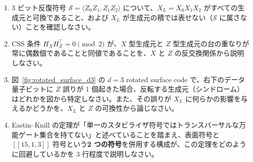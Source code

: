 \begin{exercise}
  \begin{enumerate}
    \item 3 ビット反復符号 $\mathcal{S}=\langle Z_0Z_1, Z_1Z_2\rangle$ について、$X_L=X_0X_1X_2$ がすべての生成元と可換であること、および $X_L$ が生成元の積では表せない（$\mathcal{S}$ に属さない）ことを確認しなさい。
    \item CSS 条件 $H_XH_Z^{\top}=0\pmod2$ が、$X$ 型生成元と $Z$ 型生成元の台の重なりが常に偶数個であることと同値であることを、$X$ と $Z$ の反交換関係から説明しなさい。
    \item 図~\ref{fig:rotated_surface_d3} の $d=3$ rotated surface code で、右下のデータ量子ビットに $Z$ 誤りが 1 個起きた場合、反転する生成元（シンドローム）はどれかを図から特定しなさい。また、その誤りが $X_L$ に何らかの影響を与えるかどうかを、$X_L$ と $Z$ の可換性から論じなさい。
    \item Eastin--Knill の定理が「単一のスタビライザ符号ではトランスバーサルな万能ゲート集合を持てない」と述べていることを踏まえ、表面符号と $[[15,1,3]]$ 符号という\textbf{2 つの符号}を併用する構成が、この定理をどのように回避しているかを 3 行程度で説明しなさい。
  \end{enumerate}
\end{exercise}
